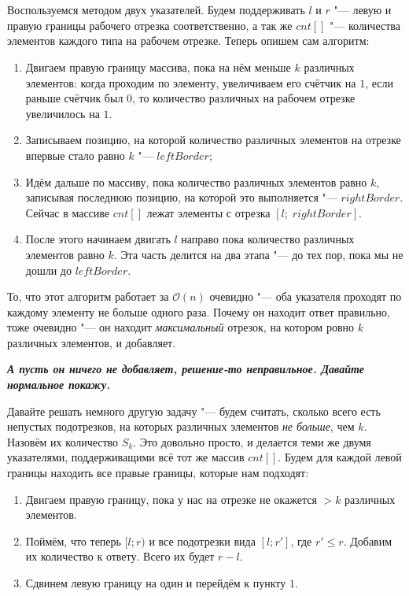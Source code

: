 \section{}
	Воспользуемся методом двух указателей. Будем поддерживать $l$ и $r$ "--- левую и правую границы рабочего отрезка соответственно, а так же $cnt[]$ "--- количества элементов каждого типа на рабочем отрезке. Теперь опишем сам алгоритм:
	
	\begin{enumerate}
		\item Двигаем правую границу массива, пока на нём меньше $k$ различных элементов: когда проходим по элементу, увеличиваем его счётчик на $1$, если раньше счётчик был $0$, то количество различных на рабочем отрезке увеличилось на $1$.
		\item Записываем позицию, на которой количество различных элементов на отрезке впервые стало равно $k$ "--- $leftBorder$;
		\item Идём дальше по массиву, пока количество различных элементов равно $k$, записывая последнюю позицию, на которой это выполняется "--- $rightBorder$. Сейчас в массиве $cnt[]$ лежат элементы с отрезка $[l;\; rightBorder]$.
		\item После этого начинаем двигать $l$ направо пока количество различных элементов равно $k$. Эта часть делится на два этапа "--- до тех пор, пока мы не дошли до $leftBorder$.
	\end{enumerate}

	То, что этот алгоритм работает за $\mathcal{O}(n)$ очевидно "--- оба указателя проходят по каждому элементу не больше одного раза. Почему он находит ответ правильно, тоже очевидно "--- он находит \textit{максимальный} отрезок, на котором ровно $k$ различных элементов, и добавляет.
	
	\textbf{\textit{А пусть он ничего не добавляет, решение-то неправильное. Давайте нормальное покажу.}}
	
	
	Давайте решать немного другую задачу "--- будем считать, сколько всего есть непустых подотрезков, на которых различных элементов \textit{не больше}, чем $k$. Назовём их количество $S_k$.
	Это довольно просто, и делается теми же двумя указателями, поддерживащими всё тот же массив $cnt[]$. Будем для каждой левой границы находить все правые границы, которые нам подходят:
	
	\begin{enumerate}
		\item Двигаем правую границу, пока у нас на отрезке не окажется $>k$ различных элементов.
		\item Поймём, что теперь $[l;r)$ и все подотрезки вида $[l; r']$, где $r' \le r$. Добавим их количество к ответу. Всего их будет $r-l$.
		\item Сдвинем левую границу на один и перейдём к пункту $1$.
	\end{enumerate}

